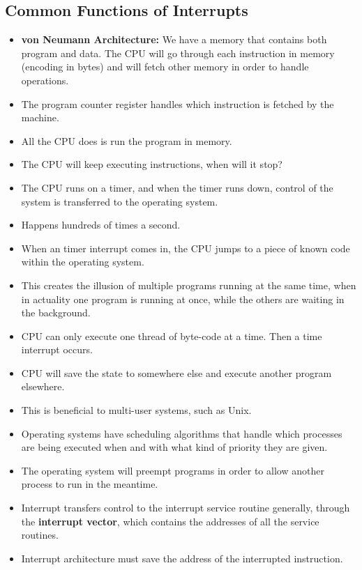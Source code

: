 \documentclass[]{article}
\begin{document}
\subsection{Common Functions of Interrupts}
\begin{itemize}
\item \textbf{von Neumann Architecture:} We have a memory that contains both
program and data. The CPU will go through each instruction in memory (encoding
in bytes) and will fetch other memory in order to handle operations.
\item The program counter register handles which instruction is fetched by the
machine.
\item All the CPU does is run the program in memory.
\item The CPU will keep executing instructions, when will it stop?
\item The CPU runs on a timer, and when the timer runs down, control of the
system is transferred to the operating system.
\item Happens hundreds of times a second.
\item When an timer interrupt comes in, the CPU jumps to a piece of known code
within the operating system.
\item This creates the illusion of multiple programs running at the same time,
when in actuality one program is running at once, while the others are waiting
in the background.
\item CPU can only execute one thread of byte-code at a time. Then a time
interrupt occurs.
\item CPU will save the state to somewhere else and execute another program
elsewhere.
\item This is beneficial to multi-user systems, such as Unix.
\item Operating systems have scheduling algorithms that handle which processes
are being executed when and with what kind of priority they are given.
\item The operating system will preempt programs in order to allow another
process to run in the meantime.
\item Interrupt transfers control to the interrupt service routine generally,
through the \textbf{interrupt vector}, which contains the addresses of all the
service routines.
\item Interrupt architecture must save the address of the interrupted
instruction.
\end{itemize}
\end{document}
